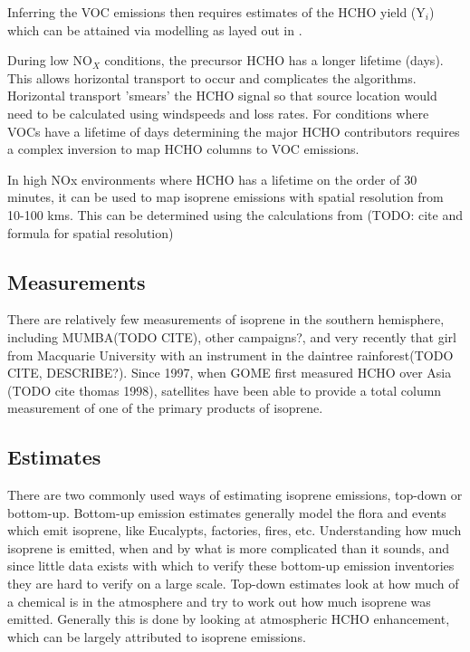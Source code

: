     Inferring the VOC emissions then requires estimates of the HCHO yield (Y$_i$) which can be attained via modelling as layed out in \citet{Millet_2006}.

    During low NO$_X$ conditions, the precursor HCHO has a longer lifetime (days).
    This allows horizontal transport to occur and complicates the algorithms.
    Horizontal transport 'smears' the HCHO signal so that source location would need to be calculated using windspeeds and loss rates.
    For conditions where VOCs have a lifetime of days determining the major HCHO contributors requires a complex inversion to map HCHO columns to VOC emissions.

    In high NOx environments where HCHO has a lifetime on the order of 30 minutes, it can be used to map isoprene emissions with spatial resolution from 10-100 kms.
    This can be determined using the calculations from (TODO: cite and formula for spatial resolution)

  \subsection{Measurements}
  
    There are relatively few measurements of isoprene in the southern hemisphere, including MUMBA(TODO CITE), other campaigns?, and very recently that girl from Macquarie University with an instrument in the daintree rainforest(TODO CITE, DESCRIBE?).
    Since 1997, when GOME first measured HCHO over Asia (TODO cite thomas 1998), satellites have been able to provide a total column measurement of one of the primary products of isoprene.
  
  \subsection{Estimates}
    There are two commonly used ways of estimating isoprene emissions, top-down or bottom-up.
    Bottom-up emission estimates generally model the flora and events which emit isoprene, like Eucalypts, factories, fires, etc.
    Understanding how much isoprene is emitted, when and by what is more complicated than it sounds, and since little data exists with which to verify these bottom-up emission inventories they are hard to verify on a large scale.
    Top-down estimates look at how much of a chemical is in the atmosphere and try to work out how much isoprene was emitted. Generally this is done by looking at atmospheric HCHO enhancement, which can be largely attributed to isoprene emissions.
  
